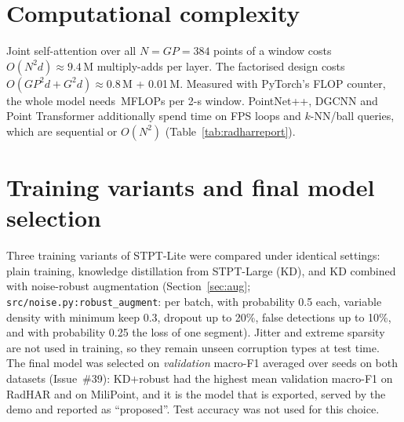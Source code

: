 \section{Computational complexity}
Joint self-attention over all $N=GP=384$ points of a window costs
$O(N^2d)\approx9.4$\,M multiply-adds per layer. The factorised design costs
$O(GP^2d+G^2d)\approx0.8$\,M + 0.01\,M. Measured with PyTorch's FLOP counter, the
whole model needs \oursMflops\,MFLOPs per 2-s window. PointNet++, DGCNN and Point
Transformer additionally spend time on FPS loops and $k$-NN/ball queries, which
are sequential or $O(N^2)$ (Table~\ref{tab:radharreport}).

\section{Training variants and final model selection}
Three training variants of STPT-Lite were compared under identical settings:
plain training, knowledge distillation from STPT-Large (KD), and KD combined with
noise-robust augmentation (Section~\ref{sec:aug}; \texttt{src/noise.py:robust\_augment}:
per batch, with probability 0.5 each, variable density with minimum keep 0.3,
dropout up to 20\%, false detections up to 10\%, and with probability 0.25 the
loss of one segment). Jitter and extreme sparsity are not used in training, so they
remain unseen corruption types at test time. The final model was selected on
\emph{validation} macro-F1 averaged over seeds on both datasets (Issue~\#39):
KD+robust had the highest mean validation macro-F1 on RadHAR and on MiliPoint, and
it is the model that is exported, served by the demo and reported as ``proposed''.
Test accuracy was not used for this choice.

